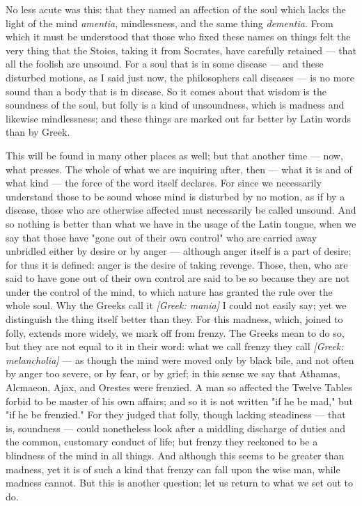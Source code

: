  No less acute was this: that they named an affection of the soul which lacks the light of the mind \textit{amentia}, mindlessness, and the same thing \textit{dementia}. From which it must be understood that those who fixed these names on things felt the very thing that the Stoics, taking it from Socrates, have carefully retained — that all the foolish are unsound. For a soul that is in some disease — and these disturbed motions, as I said just now, the philosophers call diseases — is no more sound than a body that is in disease. So it comes about that wisdom is the soundness of the soul, but folly is a kind of unsoundness, which is madness and likewise mindlessness; and these things are marked out far better by Latin words than by Greek.

 This will be found in many other places as well; but that another time — now, what presses. The whole of what we are inquiring after, then — what it is and of what kind — the force of the word itself declares. For since we necessarily understand those to be sound whose mind is disturbed by no motion, as if by a disease, those who are otherwise affected must necessarily be called unsound. And so nothing is better than what we have in the usage of the Latin tongue, when we say that those have "gone out of their own control" who are carried away unbridled either by desire or by anger — although anger itself is a part of desire; for thus it is defined: anger is the desire of taking revenge. Those, then, who are said to have gone out of their own control are said to be so because they are not under the control of the mind, to which nature has granted the rule over the whole soul. Why the Greeks call it \textit{[Greek: mania]} I could not easily say; yet we distinguish the thing itself better than they. For this madness, which, joined to folly, extends more widely, we mark off from frenzy. The Greeks mean to do so, but they are not equal to it in their word: what we call frenzy they call \textit{[Greek: melancholia]} — as though the mind were moved only by black bile, and not often by anger too severe, or by fear, or by grief; in this sense we say that Athamas, Alcmaeon, Ajax, and Orestes were frenzied. A man so affected the Twelve Tables forbid to be master of his own affairs; and so it is not written "if he be mad," but "if he be frenzied." For they judged that folly, though lacking steadiness — that is, soundness — could nonetheless look after a middling discharge of duties and the common, customary conduct of life; but frenzy they reckoned to be a blindness of the mind in all things. And although this seems to be greater than madness, yet it is of such a kind that frenzy can fall upon the wise man, while madness cannot. But this is another question; let us return to what we set out to do.

